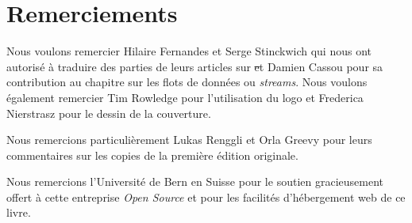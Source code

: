 \documentclass[a4paper,10pt,twoside]{book}
\begin{document}
\section*{Remerciements}


Nous voulons remercier Hilaire Fernandes et Serge Stinckwich qui nous
ont autoris\'e \`a traduire des parties de leurs articles sur \st et
Damien Cassou pour sa contribution au chapitre sur les flots de
donn\'ees ou \emph{streams}.
Nous voulons \'egalement remercier Tim Rowledge pour l'utilisation
du logo \sq et Frederica Nierstrasz pour le dessin de la couverture.

Nous remercions particuli\`erement Lukas Renggli et Orla Greevy pour leurs
commentaires sur les copies de la premi\`ere \'edition
originale.

Nous remercions l'Universit\'e de Bern en Suisse pour le soutien
gracieusement offert \`a cette entreprise \emph{Open Source} et pour
les facilit\'es d'h\'ebergement web de ce livre.


\ifx\wholebook\relax\else
   
   
\end{document}
